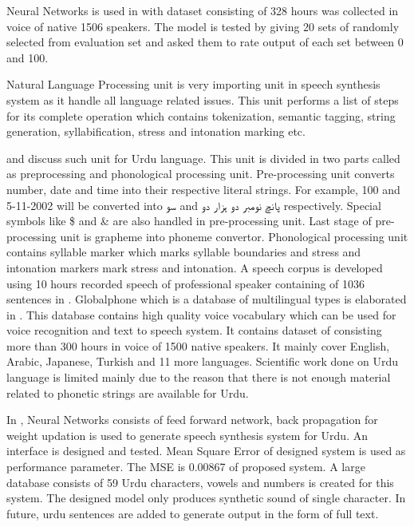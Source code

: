Neural Networks is used in \cite{wu2016merlin} with dataset consisting of 328 hours was collected in
voice of native 1506 speakers. The model is tested by giving 20 sets of randomly selected from
evaluation set and asked them to rate output of each set between 0 and 100.

Natural Language Processing unit is very importing unit in speech synthesis system as it handle all language related issues.
This unit performs a list of steps for its complete operation which contains tokenization, semantic tagging, string generation,
syllabification, stress and intonation marking etc. 

\cite{saleem2002urdu} and \cite{urdu_text_preprocessing} discuss such unit for Urdu language. This unit is divided in two parts called as preprocessing and phonological processing unit. Pre-processing unit converts number, date and time into their respective literal strings. For example, 100 and 5-11-2002 will be converted into \texturdu{سو} and \texturdu{پانچ نومبر دو ہزار دو} respectively. Special symbols like \$ and & are also handled in pre-processing unit. Last stage of pre-processing unit is grapheme into phoneme convertor. Phonological processing unit contains syllable marker which marks syllable boundaries and stress and
intonation markers mark stress and intonation. A speech corpus is developed using 10 hours recorded speech of professional speaker containing of 1036 sentences in \cite{mumtaz2016break}. Globalphone which is a database of multilingual types is elaborated in \cite{schultz2002globalphone}. This
database contains high quality voice vocabulary which can be used for voice recognition and text to speech system. It
contains dataset of consisting more than 300 hours in voice of 1500 native speakers. It mainly cover English, Arabic,
Japanese, Turkish and 11 more languages. Scientific work done on Urdu language is limited mainly due to the reason that
there is not enough material related to phonetic strings are available for Urdu. 

In \cite{urdu_tts_db_kashif2015}, Neural Networks consists of feed forward network, back propagation for weight updation is used to generate 
speech synthesis system for Urdu. An interface is designed and tested. Mean Square Error of designed system is used as performance parameter. 
The MSE is 0.00867 of proposed system. A large database consists of 59 Urdu characters, vowels and numbers is created for this system. The designed model only
produces synthetic sound of single character. In future, urdu sentences are added to generate output in the form of full text.

